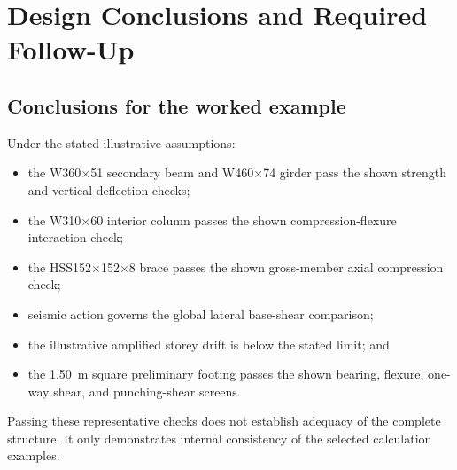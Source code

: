\section{Design Conclusions and Required Follow-Up}

\subsection{Conclusions for the worked example}
Under the stated illustrative assumptions:
\begin{itemize}
  \item the W360$\times$51 secondary beam and W460$\times$74 girder pass the shown
    strength and vertical-deflection checks;
  \item the W310$\times$60 interior column passes the shown compression-flexure
    interaction check;
  \item the HSS152$\times$152$\times$8 brace passes the shown gross-member axial
    compression check;
  \item seismic action governs the global lateral base-shear comparison;
  \item the illustrative amplified storey drift is below the stated limit; and
  \item the \SI{1.50}{\metre} square preliminary footing passes the shown bearing,
    flexure, one-way shear, and punching-shear screens.
\end{itemize}

Passing these representative checks does not establish adequacy of the complete
structure. It only demonstrates internal consistency of the selected calculation
examples.

